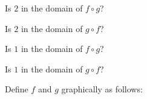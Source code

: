 \documentclass{ximera}
\begin{document}
\begin{question}

Is $2$ in the domain of $f \circ g$?

\begin{multipleChoice}
\end{multipleChoice}


Is $2$ in the domain of $g \circ f$?

\begin{multipleChoice}
\end{multipleChoice}


\end{question}








\begin{question}

Is $1$ in the domain of $f \circ g$?

\begin{multipleChoice}
\end{multipleChoice}


Is $1$ in the domain of $g \circ f$?

\begin{multipleChoice}
\end{multipleChoice}


\end{question}



























Define $f$ and $g$ graphically as follows:
\end{document}
